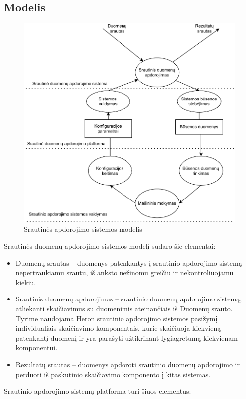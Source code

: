 \documentclass{VUMIFPSbakalaurinis}
\begin{document}
\subsection{Modelis}
\begin{figure}[H]
    \includegraphics[width=15cm]{img/DataFlow.pdf}
    \caption{Srautinės apdorojimo sistemos modelis}
    \label{dataflow}
\end{figure} 
Srautinės duomenų apdorojimo sistemos modelį sudaro šie elementai:
\begin{itemize}
    \item Duomenų srautas – duomenys patenkantys į srautinio apdorojimo sistemą nepertraukiamu srautu, iš anksto nežinomu greičiu ir nekontroliuojamu kiekiu.
    \item Srautinis duomenų apdorojimas – srautinio duomenų apdorojimo sistemą, atliekanti skaičiavimus su duomenimis ateinančiais iš Duomenų srauto. Tyrime naudojama Heron srautinio apdorojimo sistemos pasižymį individualiais skaičiavimo komponentais, kurie skaičiuoja kiekvieną patenkantį duomenį ir yra parašyti užtikrinant lygiagretumą kiekvienam komponentui.
    \item Rezultatų srautas – duomenys apdoroti srautinio duomenų apdorojimo ir perduoti iš paskutinio skaičiavimo komponento į kitas sistemas.
\end{itemize}
Srautinio apdorojimo sistemų platforma turi šiuos elementus:
\end{document}
